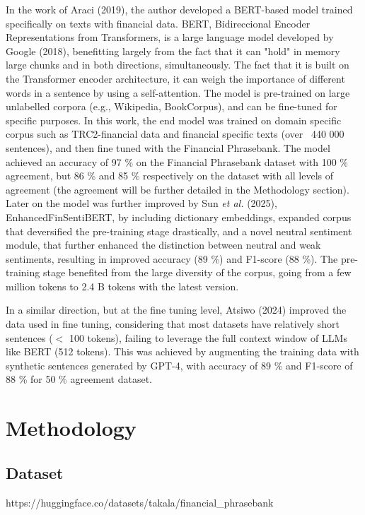 \documentclass[conference]{IEEEtran}
\begin{document}
In the work of Araci (2019), the author developed a BERT-based model trained specifically on texts with financial data. BERT, Bidireccional Encoder Representations from Transformers, is a large language model developed by Google (2018), benefitting largely from the fact that it can "hold" in memory large chunks and in both directions, simultaneously. The fact that it is built on the Transformer encoder architecture, it can weigh the importance of different words in a sentence by using a self-attention. The model is pre-trained  on large unlabelled corpora (e.g., Wikipedia, BookCorpus), and can be fine-tuned for specific purposes. In this work, the end model was trained on  domain specific corpus such as TRC2-financial data and financial specific texts (over ~440 000 sentences), and then fine tuned with the Financial Phrasebank. The model achieved an accuracy of 97 \% on the Financial Phrasebank dataset with 100 \% agreement, but 86 \% and 85 \% respectively on the dataset with all levels of agreement (the agreement will be further detailed in the Methodology section). Later on the model was further improved by Sun \textit{et al.} (2025), EnhancedFinSentiBERT, by including dictionary embeddings, expanded corpus that deversified the pre-training stage drastically, and a novel neutral sentiment module, that further enhanced the distinction between neutral and weak sentiments, resulting in improved accuracy (89 \%) and F1-score (88 \%). The pre-training stage benefited from the large diversity of the corpus, going from a few million tokens to 2.4 B tokens with the latest version.

In a similar direction, but at the fine tuning level, Atsiwo (2024) improved the data used in fine tuning, considering that most datasets have relatively short sentences ($<$ 100 tokens), failing to leverage the full context window  of LLMs like BERT (512 tokens). This was achieved by augmenting  the training data with synthetic sentences generated by GPT-4, with accuracy of 89 \% and F1-score of 88 \% for 50 \% agreement dataset.


\section{Methodology}

\subsection{Dataset}

https://huggingface.co/datasets/takala/financial\_phrasebank
\cite{dataset, malo2013gooddebtbaddebt}
\end{document}
